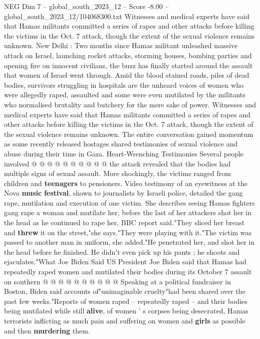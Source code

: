 \begin{textsample}{NEG Dim 7 – global\_south\_2023\_12 – Score -8.00 – global\_south\_2023\_12/104068300.txt}  \label{ex:f7_neg_412}
Witnesses and medical experts have said that Hamas militants committed a series of rapes and other attacks before killing the victims in the Oct. 7 attack, though the extent of the sexual violence remains unknown.
New Delhi : Two months since Hamas militant unleashed massive attack on Israel, launching rocket attacks, storming houses, bombing parties and opening fire on innocent civilians, the buzz has finally started around the assault that women of Israel went through.
Amid the blood stained roads, piles of dead bodies, survivors struggling in hospitals are the unheard voices of women who were allegedly raped, assaulted and some were even mutilated by the militants who normalised brutality and butchery for the mere sake of power.
Witnesses and medical experts have said that Hamas militants committed a series of rapes and other attacks before killing the victims in the Oct. 7 attack, though the extent of the sexual violence remains unknown.
The entire conversation gained momentum as some recently released hostages shared testimonies of sexual violence and abuse during their time in Gaza.
Heart-Wrenching Testimonies Several people involved @ @ @ @ @ @ @ @ @ @ the attack revealed that the bodies had multiple signs of sexual assault.
More shockingly, the victims ranged from children and \textbf{teenagers} to pensioners.
Video testimony of an eyewitness at the Nova \textbf{music} \textbf{festival}, shown to journalists by Israeli police, detailed the gang rape, mutilation and execution of one victim.
She describes seeing Hamas fighters gang rape a woman and mutilate her, before the last of her attackers shot her in the head as he continued to rape her, BBC report said."They sliced her breast and \textbf{threw} it on the street,"she says."They were playing with it."The victim was passed to another man in uniform, she added."He penetrated her, and shot her in the head before he finished.
He didn't even pick up his pants ; he shoots and ejaculates."What Joe Biden Said US President Joe Biden said that Hamas had repeatedly raped women and mutilated their bodies during its October 7 assault on southern @ @ @ @ @ @ @ @ @ @ Speaking at a political fundraiser in Boston, Biden said accounts of"unimaginable cruelty"had been shared over the past few weeks."Reports of women raped -- repeatedly raped -- and their bodies being mutilated while still \textbf{alive}, of women ' s corpses being desecrated, Hamas terrorists inflicting as much pain and suffering on women and \textbf{girls} as possible and then \textbf{murdering} them.

\end{textsample}
